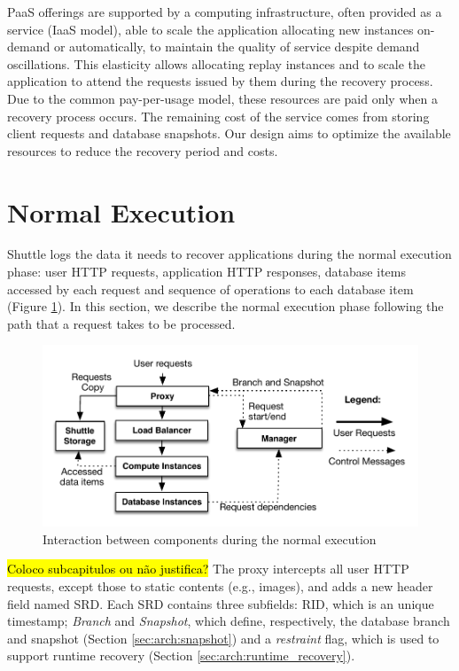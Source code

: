 PaaS offerings are supported by a computing infrastructure, often provided as a service (IaaS model), able to scale the application allocating new instances on-demand or automatically, to maintain the quality of service despite demand oscillations. This elasticity  allows allocating replay instances and to scale the application to attend the requests issued by them during the recovery process. Due to the common pay-per-usage model, these resources are paid only when a recovery process occurs. The remaining cost of the service comes from storing client requests and database snapshots. Our design aims to optimize the available resources to reduce the recovery period and costs. 


\section{Normal Execution}
\label{sec:arch:normal_execution}
Shuttle logs the data it needs to recover applications during the normal execution phase: user \ac{HTTP} requests, application \ac{HTTP} responses, database items accessed by each request and sequence of operations to each database item (Figure \ref{fig:normal_execution}). In this section, we describe the normal execution phase following the path that a request takes to be processed.

\begin{figure}
\centering
\includegraphics[width=130mm]{images/normalExecution}
\caption{Interaction between components during the normal execution}
\label{fig:normal_execution}
\end{figure}

\hl{Coloco subcapitulos ou não justifica?}
The proxy intercepts all user \ac{HTTP} requests, except those to static contents (e.g., images), and adds a new header field named \acf{SRD}. Each \ac{SRD} contains three subfields: \acf{RID}, which is an unique timestamp; \emph{Branch} and \emph{Snapshot}, which define, respectively, the database branch and snapshot (Section \ref{sec:arch:snapshot}) and a \emph{restraint} flag, which is used to support runtime recovery (Section \ref{sec:arch:runtime_recovery}). 


